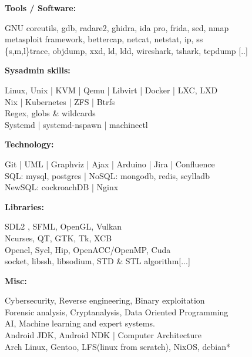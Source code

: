 \documentclass[a4paper,10pt]{article}
\begin{document}
\begin{adjustbox}{valign=t}
\begin{minipage}{0.6\textwidth}
\begin{description}
\begin{spacing}{0.95}
\item{\textbf{Tools / Software:}}

    GNU coreutils, gdb, radare2, ghidra, ida pro, frida, sed, nmap\\
    metasploit framework, bettercap, netcat, netstat, ip, ss\\
    \{s,m,l\}trace, objdump, xxd, ld, ldd, wireshark, tshark, tcpdump {[..]}

\item{\textbf{Sysadmin skills:}}

    Linux, Unix | KVM | Qemu | Libvirt | Docker | LXC, LXD\\
    Nix | Kubernetes | ZFS | Btrfs\\
    Regex, globs \& wildcards\\
    Systemd | systemd-nspawn | machinectl

\item{\textbf{Technology:}}

    Git | UML | Graphviz | Ajax | Arduino | Jira | Confluence\\
    SQL: mysql, postgres | NoSQL: mongodb, redis, scylladb\\
    NewSQL: cockroachDB | Nginx

\item{\textbf{Libraries:}}

    SDL2 , SFML, OpenGL, Vulkan\\
    Ncurses, QT, GTK, Tk, XCB\\
    Opencl, Sycl, Hip, OpenACC/OpenMP, Cuda\\
    socket, libssh, libsodium, STD \& STL algorithm{[...]}

\item{\textbf{Misc:}}

    Cybersecurity, Reverse engineering, Binary exploitation\\
    Forensic analysis, Cryptanalysis, Data Oriented Programming\\
    AI, Machine learning and expert systems.\\
    Android JDK, Android NDK | Computer Architecture\\
    Arch Linux, Gentoo, LFS(linux from scratch), NixOS, debian*

\vspace{-2.2\baselineskip}
\end{spacing}
\end{description}



\end{minipage}
\end{adjustbox}
\end{document}
